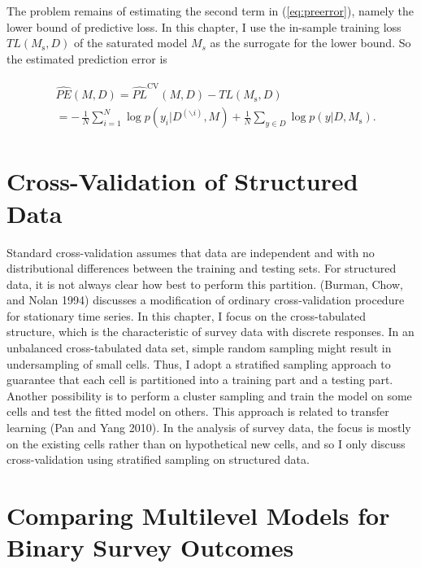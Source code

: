 The problem remains of estimating the second term in
(\ref{eq:preerror}), namely the lower bound of predictive loss. In this
chapter, I use the in-sample training loss \(TL(M_{\text{s}}, D)\) of
the saturated model \(M_s\) as the surrogate for the lower bound. So the
estimated prediction error is

\begin{align}
\begin{split}
  \label{eq:esti_preerror}
  &\widehat{PE}(M, D)=\widehat{PL}^{\text{CV}}(M,D)-TL(M_{\text{s}},D)\\
  &= -\,\frac{1}{N}\sum_{i=1}^N\log p(y_i|D^{(\backslash i)},
  M)+\frac{1}{N}\sum_{y\in D}\log p(y | D, M_{\text{s}}).
\end{split}
\end{align}

\section{Cross-Validation of Structured
Data}\label{cross-validation-of-structured-data}

Standard cross-validation assumes that data are independent and with no
distributional differences between the training and testing sets. For
structured data, it is not always clear how best to perform this
partition. (Burman, Chow, and Nolan 1994) discusses a modification of
ordinary cross-validation procedure for stationary time series. In this
chapter, I focus on the cross-tabulated structure, which is the
characteristic of survey data with discrete responses. In an unbalanced
cross-tabulated data set, simple random sampling might result in
undersampling of small cells. Thus, I adopt a stratified sampling
approach to guarantee that each cell is partitioned into a training part
and a testing part. Another possibility is to perform a cluster sampling
and train the model on some cells and test the fitted model on others.
This approach is related to transfer learning (Pan and Yang 2010). In
the analysis of survey data, the focus is mostly on the existing cells
rather than on hypothetical new cells, and so I only discuss
cross-validation using stratified sampling on structured data.

\section{Comparing Multilevel Models for Binary Survey
Outcomes}\label{comparing-multilevel-models-for-binary-survey-outcomes}


